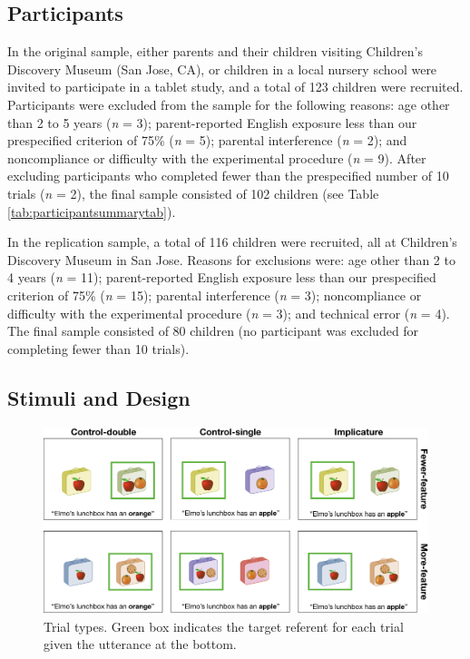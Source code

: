 \documentclass[mask,man]{apa6}
\theoremstyle{definition}
\theoremstyle{definition}
\theoremstyle{definition}
\theoremstyle{remark}
\begin{document}
\subsection{Participants}\label{participants}

In the original sample, either parents and their children visiting
Children's Discovery Museum (San Jose, CA), or children in a local
nursery school were invited to participate in a tablet study, and a
total of 123 children were recruited. Participants were excluded from
the sample for the following reasons: age other than 2 to 5 years
(\emph{n} = 3); parent-reported English exposure less than our
prespecified criterion of 75\% (\emph{n} = 5); parental interference
(\emph{n} = 2); and noncompliance or difficulty with the experimental
procedure (\emph{n} = 9). After excluding participants who completed
fewer than the prespecified number of 10 trials (\emph{n} = 2), the
final sample consisted of 102 children (see Table
\ref{tab:participantsummarytab}).

In the replication sample, a total of 116 children were recruited, all
at Children's Discovery Museum in San Jose. Reasons for exclusions were:
age other than 2 to 4 years (\emph{n} = 11); parent-reported English
exposure less than our prespecified criterion of 75\% (\emph{n} = 15);
parental interference (\emph{n} = 3); noncompliance or difficulty with
the experimental procedure (\emph{n} = 3); and technical error (\emph{n}
= 4). The final sample consisted of 80 children (no participant was
excluded for completing fewer than 10 trials).

\subsection{Stimuli and Design}\label{stimuli-and-design}

\begin{figure}
\includegraphics[width=5.98in]{figs/stimuli} \caption{Trial types. Green box indicates the target referent for each trial given the utterance at the bottom.}\label{fig:stimuli}
\end{figure}
\end{document}
